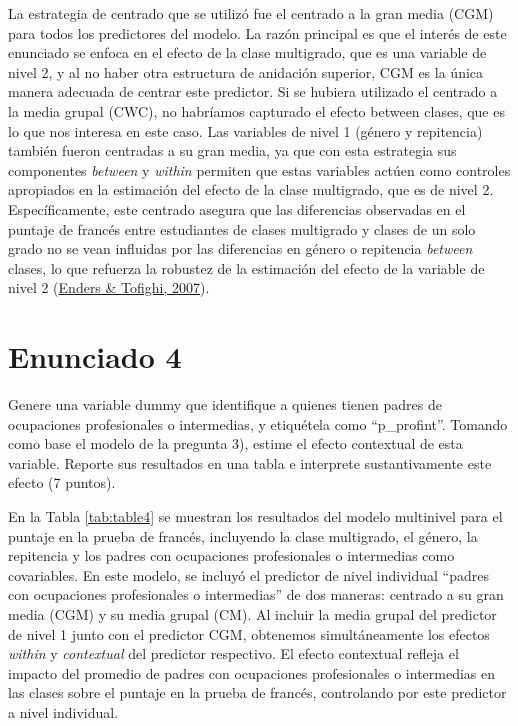 \documentclass[
  12pt,
  a4paper,
]{article}
\begin{document}
La estrategia de centrado que se utilizó fue el centrado a la gran media (CGM) para todos los predictores del modelo. La razón principal es que el interés de este enunciado se enfoca en el efecto de la clase multigrado, que es una variable de nivel 2, y al no haber otra estructura de anidación superior, CGM es la única manera adecuada de centrar este predictor. Si se hubiera utilizado el centrado a la media grupal (CWC), no habríamos capturado el efecto between clases, que es lo que nos interesa en este caso. Las variables de nivel 1 (género y repitencia) también fueron centradas a su gran media, ya que con esta estrategia sus componentes \emph{between} y \emph{within} permiten que estas variables actúen como controles apropiados en la estimación del efecto de la clase multigrado, que es de nivel 2. Específicamente, este centrado asegura que las diferencias observadas en el puntaje de francés entre estudiantes de clases multigrado y clases de un solo grado no se vean influidas por las diferencias en género o repitencia \emph{between} clases, lo que refuerza la robustez de la estimación del efecto de la variable de nivel 2 (\protect\hyperlink{ref-enders_centering_2007}{Enders \& Tofighi, 2007}).

\hypertarget{enunciado-4}{%
\section{Enunciado 4}\label{enunciado-4}}

Genere una variable dummy que identifique a quienes tienen padres de ocupaciones profesionales o intermedias, y etiquétela como ``p\_profint''. Tomando como base el modelo de la pregunta 3), estime el efecto contextual de esta variable. Reporte sus resultados en una tabla e interprete sustantivamente este efecto (7 puntos).

En la Tabla \ref{tab:table4} se muestran los resultados del modelo multinivel para el puntaje en la prueba de francés, incluyendo la clase multigrado, el género, la repitencia y los padres con ocupaciones profesionales o intermedias como covariables. En este modelo, se incluyó el predictor de nivel individual ``padres con ocupaciones profesionales o intermedias'' de dos maneras: centrado a su gran media (CGM) y su media grupal (CM). Al incluir la media grupal del predictor de nivel 1 junto con el predictor CGM, obtenemos simultáneamente los efectos \emph{within} y \emph{contextual} del predictor respectivo. El efecto contextual refleja el impacto del promedio de padres con ocupaciones profesionales o intermedias en las clases sobre el puntaje en la prueba de francés, controlando por este predictor a nivel individual.
\end{document}
